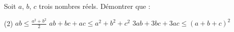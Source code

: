 %
%
Soit $a$, $b$, $c$ trois nombres réels. Démontrer que :
	\begin{tasks}(2)
		\task  $ab \le \frac{a^2+b^2}{2}$
		\task  $ab+bc+ac \le a^2+b^2+c^2$
		\task  $3ab+3bc+3ac \le (a+b+c)^2$
	\end{tasks}
